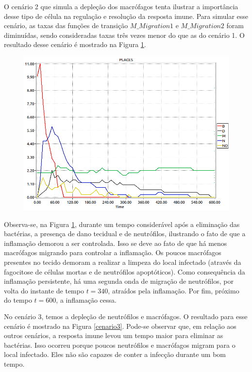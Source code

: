 \documentclass[a4paper,10pt]{article}
\begin{document}
		O cenário 2 que simula a depleção dos macrófagos tenta ilustrar a importância desse tipo de célula na regulação e resolução da resposta imune. 
		Para simular esse cenário, as taxas das funções de transição $M\_Migration1$ e $M\_Migration2$ foram diminuídas, sendo consideradas taxas três vezes menor 
		do que as do cenário 1. O resultado desse cenário é mostrado na Figura \ref{cenario2}. 
		
		\begin{figure}
			\begin{center}
				\includegraphics[scale=0.45]{imagens/resultados/RedeB_N_M_D_AC_27-02_v3-MacrophageDepletion-fig2_PLACES.png}
			\end{center}
			\caption{ }
			\label{cenario2}
		\end{figure}
		
		Observa-se, na Figura \ref{cenario2}, durante um tempo considerável após a eliminação das bactérias, a presença de dano tecidual e de neutrófilos, 
		ilustrando o fato de que a inflamação demorou a ser controlada. 
		Isso se deve ao fato de que há menos macrófagos migrando para controlar a inflamação. Os poucos macrófagos presentes no tecido demoram a realizar a limpeza 
		do local infectado (através da fagocitose de células mortas e de neutrófilos apoptóticos). Como consequência da inflamação persistente, há uma segunda 
		onda de migração de neutrófilos, por volta do instante de tempo $t=340$, atraídos pela inflamação. Por fim, próximo do tempo $t = 600$, 
		a inflamação cessa. 
		
		No cenário 3, temos a depleção de neutrófilos e macrófagos. O resultado para esse cenário é mostrado na Figura \ref{cenario3}. 
		Pode-se observar que, em relação aos outros cenários, a resposta imune levou um tempo maior para eliminar as bactérias. 
		Isso ocorreu porque poucos neutrófilos e macrófagos migram para o local infectado. Eles não são capazes de conter a infecção 
		durante um bom tempo. 
		
\end{document}
